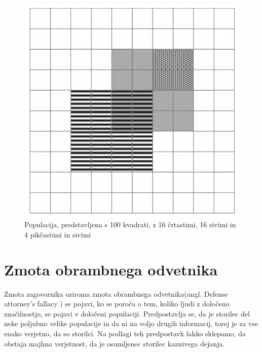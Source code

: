 \documentclass[12pt,a4paper]{amsart}
\theoremstyle{definition} %
\theoremstyle{plain} %
\begin{document}
\begin{figure}[!ht]\label{fig:slika2}
    \centering
    \includegraphics[scale=0.45]{slika2.png}
    \caption{Populacija, predstavljena s 100 kvadrati, z 16 črtastimi, 16 sivimi in 4 pikčastimi in sivimi}\vspace{2mm}
 \end{figure}
 
\section{Zmota obrambnega odvetnika}
Zmota zagovornika oziroma zmota obrambnega odvetnika(angl. Defense attorney's fallacy ) se pojavi, ko se poroča o tem, koliko ljudi z 
določeno značilnostjo, se pojavi v določeni populaciji. Predpostavlja se, da je storilec del neke poljubno velike populacije in da ni na voljo 
drugih informacij, torej je za vse enako verjetno, da so storilci. Na podlagi teh predpostavk lahko sklepamo, da obstaja majhna verjetnost, 
da je osumljenec storilec kaznivega dejanja. \\

\end{document}
